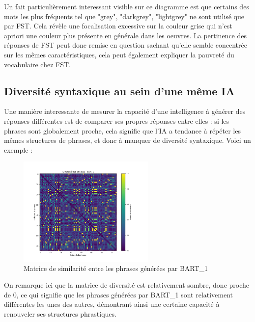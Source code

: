 \documentclass[conference]{IEEEtran}
\begin{document}
\vspace{5mm}

Un fait particulièrement interessant visible sur ce diagramme est que certains des mots les plus fréquents tel que "grey", "darkgrey", "lightgrey" ne sont utilisé que par FST. Cela révèle une focalisation excessive sur la couleur grise qui n'est apriori une couleur plus présente en générale dans les oeuvres. 
La pertinence des réponses de FST peut donc remise en question sachant qu'elle semble concentrée sur les mêmes caractéristiques, cela peut également expliquer la pauvreté du vocabulaire chez FST.

\subsection {Diversité syntaxique au sein d'une même IA}

Une manière interessante de mesurer la capacité d'une intelligence à générer des réponses différentes est de comparer ses propres réponses entre elles : si les phrases sont globalement proche, cela signifie que l'IA a tendance à répéter les mêmes structures de phrases, et donc à manquer de diversité syntaxique.
Voici un exemple : 

\vspace{5mm}

\begin{figure}[H]
\centering
\includegraphics[width=0.6\textwidth]{images/diversity_matrix_bart_1.png}
\caption{Matrice de similarité entre les phrases générées par BART\_1}
\end{figure}

\vspace{5mm}

On remarque ici que la matrice de diversité est relativement sombre, donc proche de 0, ce qui signifie que les phrases générées par BART\_1 sont relativement différentes les unes des autres, démontrant ainsi une certaine capacité à renouveler ses structures phrastiques.
\end{document}
